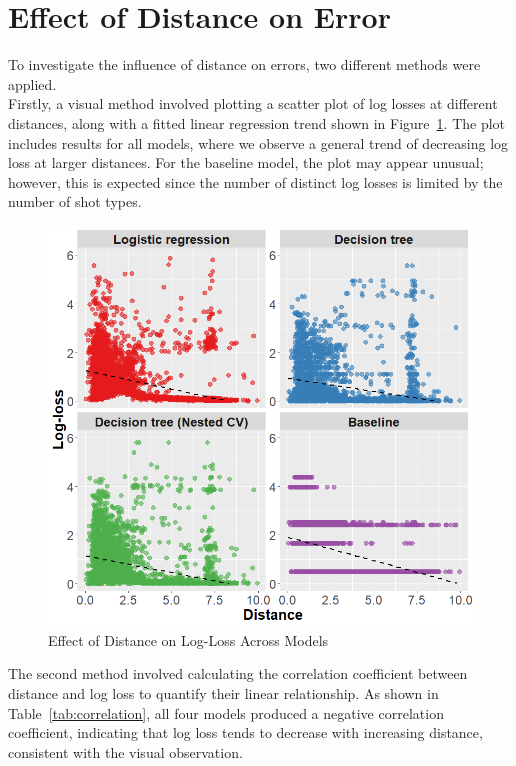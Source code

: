 \documentclass[9pt]{IEEEtran}
\begin{document}
\section{Effect of Distance on Error}
To investigate the influence of distance on errors, two different methods 
were applied.
\\
Firstly, a visual method involved plotting a scatter plot of log losses at 
different distances, along with a fitted linear regression trend shown in
 Figure~\ref{fig:error_distance}. The plot includes results for all models,
  where we observe a general trend of decreasing log loss at larger distances.
For the baseline model, the plot may appear unusual; however, this is 
expected since the number of distinct log losses is limited by the number
 of shot types.

 \begin{figure}[h]
    \centering
    \includegraphics[width=0.95\columnwidth]{figures/distance_error.png}
    \caption{Effect of Distance on Log-Loss Across Models}
    \label{fig:error_distance}
\end{figure}

 The second method involved calculating the correlation coefficient between 
 distance and log loss to quantify their linear relationship. As shown in 
 Table~\ref{tab:correlation}, all four models produced a negative correlation
  coefficient, indicating that log loss tends to decrease with increasing 
  distance, consistent with the visual observation.
\end{document}
